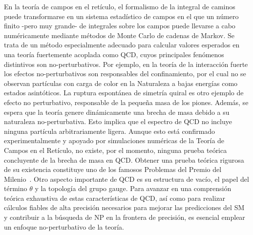 En la teoría de campos en el retículo, el formalismo de la integral de caminos puede transformarse en un sistema estadístico de campos en el que un número finito -pero muy grande- de integrales sobre los campos puede llevarse a cabo numéricamente mediante métodos de Monte Carlo de cadenas de Markov. Se trata de un método especialmente adecuado para calcular valores esperados en una teoría fuertemente acoplada como QCD, cuyos principales fenómenos distintivos son no-perturbativos. Por ejemplo, en la teoría de la interacción fuerte los efectos no-perturbativos son responsables del confinamiento, por el cual no se observan partículas con carga de color en la Naturaleza a bajas energías como estados asintóticos. La ruptura espontánea de simetría quiral es otro ejemplo de efecto no perturbativo, responsable de la pequeña masa de los piones. Además, se espera que la teoría genere dinámicamente una brecha de masa debido a su naturaleza no-perturbativa. Esto implica que el espectro de QCD no incluye ninguna partícula arbitrariamente ligera. Aunque esto está confirmado experimentalmente y apoyado por simulaciones numéricas de la Teoría de Campos en el Retículo, no existe, por el momento, ninguna prueba teórica concluyente de la brecha de masa en QCD. Obtener una prueba teórica rigurosa de su existencia constituye uno de los famosos Problemas del Premio del Milenio~\citep{MillenniumPrizeproblems}. Otro aspecto importante de QCD es su estructura de vacío, el papel del término $\theta$ y la topología del grupo gauge. Para avanzar en una comprensión teórica exhaustiva de estas características de QCD, así como para realizar cálculos fiables de alta precisión necesarios para mejorar las predicciones del SM y contribuir a la búsqueda de NP en la frontera de precisión, es esencial emplear un enfoque no-perturbativo de la teoría.

